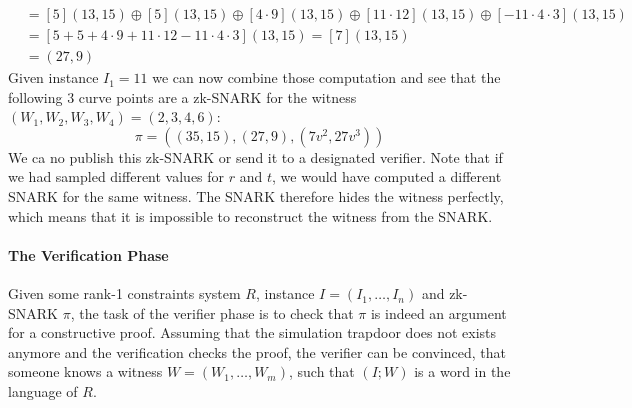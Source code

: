\begin{example}
\begin{align*}
       & = [5](13,15)\oplus [5](13,15) \oplus [4\cdot 9](13,15) \oplus [11\cdot 12](13,15) \oplus [-11\cdot 4\cdot 3](13,15)\\    
       & = [5+5+4\cdot 9+11\cdot 12-11\cdot 4\cdot 3](13,15)=[7](13,15)\\
       & = (27,9)
\end{align*}
Given instance $I_1=11$ we can now combine those computation and see that the following $3$ curve points are a zk-SNARK for the witness $(W_1,W_2,W_3,W_4)=(2,3,4,6)$:
$$
\pi=((35,15),(27,9),(7v^2,27v^3))
$$
We ca no publish this zk-SNARK or send it to a designated verifier. Note that if we had sampled different values for $r$ and $t$, we would have computed a different SNARK for the same witness. The SNARK therefore hides the witness perfectly, which means that it is impossible to reconstruct the witness from the SNARK.
\end{example}

\paragraph{The Verification Phase}Given some rank-1 constraints system $R$, instance $I=(I_1,\ldots, I_n)$ and zk-SNARK $\pi$, the task of the verifier phase is to check that $\pi$ is indeed an argument for a constructive proof. Assuming that the simulation trapdoor does not exists anymore and the verification checks the proof, the verifier can be convinced, that someone knows a witness $W=(W_1,\ldots,W_m)$, such that $(I;W)$ is a word in the language of $R$.  

